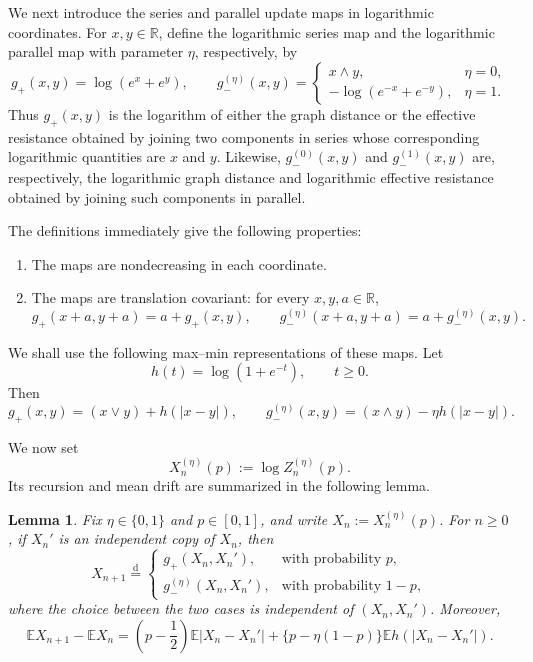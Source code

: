 \documentclass[12pt]{amsart}
\numberwithin{equation}{section}
\theoremstyle{plain}
\newtheorem{lemma}[theorem]{Lemma}
\theoremstyle{definition}
\newcommand{\E}{\mathbb E}
\newcommand{\R}{\mathbb R}
\begin{document}
We next introduce the series and parallel update maps in logarithmic coordinates.
For $x,y\in\R$, define the
logarithmic series map and the logarithmic parallel map with parameter
$\eta$, respectively, by
\[
 g_+(x,y)=\log(e^x+e^y),
 \qquad
 g_-^{(\eta)}(x,y)=
 \begin{cases}
  x\wedge y,&\eta=0,\\
 -\log(e^{-x}+e^{-y}),&\eta=1.
 \end{cases}
\]
Thus $g_+(x,y)$ is the logarithm of either the graph distance or the effective
resistance obtained by joining two components in series whose corresponding
logarithmic quantities are $x$ and $y$.  Likewise, $g_-^{(0)}(x,y)$ and
$g_-^{(1)}(x,y)$ are, respectively, the logarithmic graph distance and
logarithmic effective resistance obtained by joining such components in
parallel.

The definitions immediately give the following properties:
\begin{enumerate}
\item The maps are nondecreasing in each coordinate.
\item The maps are translation covariant: for every $x,y,a\in\R$,
\begin{equation}
 g_+(x+a,y+a)=a+g_+(x,y),
 \qquad
 g_-^{(\eta)}(x+a,y+a)=a+g_-^{(\eta)}(x,y).
 \label{eq:gate-translation}
\end{equation}
\end{enumerate}

We shall use the following max--min representations of these maps.  Let
\[
 h(t)=\log(1+e^{-t}),\qquad t\ge0.
\]
Then
\begin{equation}
 g_+(x,y)=(x\vee y)+h(|x-y|),
 \qquad
 g_-^{(\eta)}(x,y)=(x\wedge y)-\eta h(|x-y|).
 \label{eq:log-series-gate}
\end{equation}

We now set
\[
 X_n^{(\eta)}(p):=\log Z_n^{(\eta)}(p).
\]
Its recursion and mean drift are summarized in the following lemma.

\begin{lemma}
\label{lem:logarithmic-drift}
Fix $\eta\in\{0,1\}$ and $p\in[0,1]$, and write
$X_n:=X_n^{(\eta)}(p)$.  For $n\ge0$, if $X_n'$ is an independent copy of
$X_n$, then
\begin{equation}
 X_{n+1}\overset{\mathrm d}{=}
 \begin{cases}
  g_+(X_n,X_n'),&\text{with probability }p,\\
  g_-^{(\eta)}(X_n,X_n'),&\text{with probability }1-p,
 \end{cases}
 \label{eq:log-rde}
\end{equation}
where the choice between the two cases is independent of $(X_n,X_n')$.
Moreover,
\begin{equation}
 \E X_{n+1}-\E X_n
 =\left(p-\frac12\right)\E|X_n-X_n'|
 +\{p-\eta(1-p)\}\E h(|X_n-X_n'|).
 \label{eq:drift-identity}
\end{equation}
\end{lemma}
\end{document}
